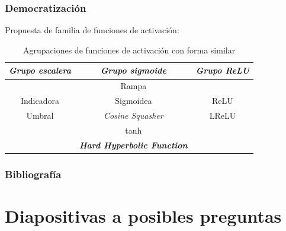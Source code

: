 \documentclass{beamer}
\begin{document}
\begin{frame}
    \frametitle{Democratización }
    Propuesta de familia de funciones de activación: 
    \begin{table}[H] 
        \centering  
        \begin{tabular}{| c | c | c | }
            \hline
            \textit{Grupo escalera} & \textit{Grupo sigmoide} & \textit{Grupo ReLU} \\
            \hline
           &  Rampa &  \\
           Indicadora & Sigmoidea & ReLU\\
           Umbral & \textit{Cosine Squasher}& LReLU\\
            & tanh & \\
            & \textbf{\textit{Hard Hyperbolic Function}}& \\
    \hline
        \end{tabular}
        \caption{Agrupaciones de funciones de activación con forma similar}  
        \label{table:Clases-equivalencia-activation-function}
    \end{table}
    

\end{frame}

\begin{frame}
    \frametitle{Bibliografía}
    \printbibliography
    
\end{frame}

\section*{Diapositivas a posibles preguntas}
\end{document}
